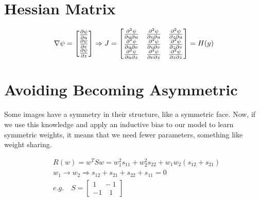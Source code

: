 \documentclass{article}
\begin{document}
\section{Hessian Matrix}
\begin{equation*}
    \nabla \psi =
    \begin{bmatrix}
        \pdv{\psi}{u} \\
        \pdv{\psi}{v} \\
        \pdv{\psi}{z} 
    \end{bmatrix}
    \Rightarrow J = 
    \begin{bmatrix}
        \pdv[2]{\psi}{u}{u} & \pdv[2]{\psi}{v}{u} & \pdv[2]{\psi}{z}{u} \\
        \pdv[2]{\psi}{u}{v} & \pdv[2]{\psi}{v}{v} & \pdv[2]{\psi}{z}{v} \\
        \pdv[2]{\psi}{u}{z} & \pdv[2]{\psi}{v}{z} & \pdv[2]{\psi}{z}{z}
    \end{bmatrix}
    = H(y)
\end{equation*}

\section{Avoiding Becoming Asymmetric}
Some images have a symmetry in their structure, like a symmetric face. 
Now, if we use this knowledge and apply an inductive bias to our model
to learn symmetric weights, it means that we need fewer parameters, 
something like weight sharing.

\begin{align*}
    &R(w) = w^TSw = w_1^2s_{11} + w_2^2 s_{22} + w_1 w_2(s_{12} + s_{21}) \\
    &w_1 \rightarrow w_2 \Rightarrow s_{12} + s_{21} + s_{22} + s_{11} = 0 \\
    &e.g. \quad 
    S = \begin{bmatrix}
            1 \quad -1 \\
            -1 \quad 1
        \end{bmatrix}
\end{align*}
\end{document}
